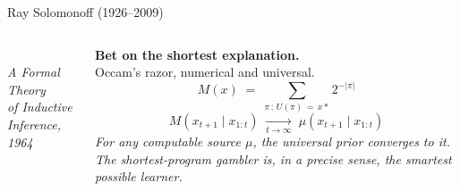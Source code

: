 \documentclass[aspectratio=169, 12pt, xcolor={dvipsnames,table}]{beamer}
\begin{document}
\begin{frame}{Ray Solomonoff \; \small(1926--2009)}
  \begin{columns}[c]
    \begin{center}
      \\[4pt]
      {\footnotesize\itshape A Formal Theory\\ of Inductive Inference, 1964}
    \end{center}
    {\small\textbf{Bet on the shortest explanation.}}\\[6pt]
    {\small Occam's razor, numerical and universal.}
    \vspace{0.6em}
    \begin{equation*}
      M(x) \;=\; \sum_{\pi \,:\, U(\pi)\,=\,x\ast}\! 2^{-|\pi|}
    \end{equation*}
    \vspace{-0.4em}
    \begin{equation*}
      M(x_{t+1}\mid x_{1:t})\;\xrightarrow[t\to\infty]{}\;\mu(x_{t+1}\mid x_{1:t})
    \end{equation*}
    \vspace{0.2em}
    {\footnotesize\itshape For \emph{any} computable source $\mu$,
    the universal prior converges to it. The shortest-program
    gambler is, in a precise sense, the smartest possible learner.}
  \end{columns}
\end{frame}
\end{document}
